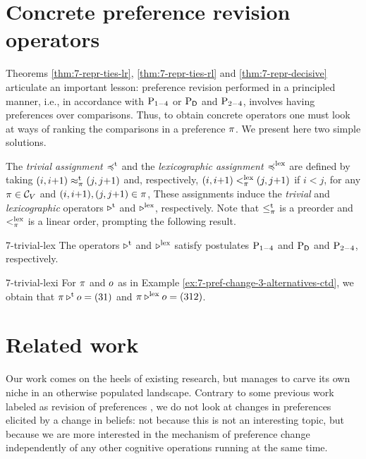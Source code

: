 \section{Concrete preference revision operators}\label{sec:7-concrete-operator}
Theorems \ref{thm:7-repr-ties-lr}, 
\ref{thm:7-repr-ties-rl} and \ref{thm:7-repr-decisive} articulate an important lesson:
preference revision performed in a principled manner, 
i.e., in accordance with $\mathrm{P}_{1-4}$ or $\mathrm{P}_{\mathsf{D}}$ and $\mathrm{P}_{2-4}$,
involves having preferences over comparisons.
Thus, to obtain concrete operators one must look at ways of 
ranking the comparisons in a preference $\pi$.
We present here two simple solutions.

The \emph{trivial assignment $\preccurlyeq^\mathrm{t}$}
and the \emph{lexicographic assignment $\preccurlyeq^\mathrm{lex}$} 
are defined by taking $({i},{i}{+}{1})\approx^\mathrm{t}_\pi({j},{j}{+}{1})$
and, respectively,
$
({i},{i}{+}{1})<^\mathrm{lex}_\pi({j},{j}{+}{1})
$ if $i<j$,
for any $\pi\in\mathcal{C}_V$ and $({i},{i}{+}{1}),({j},{j}{+}{1})\in\pi$,
These assignments induce the \emph{trivial} and \emph{lexicographic} operators $\triangleright^\mathrm{t}$ and $\triangleright^\mathrm{lex}$, respectively.
Note that $\le_{\pi}^\mathrm{t}$ is a preorder and $<^\mathrm{lex}_\pi$ is a linear order, prompting the following result.

\begin{prp}{}{7-trivial-lex}
	The operators $\triangleright^\mathrm{t}$ and $\triangleright^\mathrm{lex}$ satisfy postulates $\mathrm{P}_{1-4}$
	and $\mathrm{P}_{\mathsf{D}}$ and $\mathrm{P}_{2-4}$, respectively.	
\end{prp}

\begin{xmpl}{}{7-trivial-lexi}
	For $\pi$ and $o$ as in Example \ref{ex:7-pref-change-3-alternatives-ctd}, 
	we obtain that
	$\pi\triangleright^\mathrm{t}o=(31)$ and $\pi\triangleright^\mathrm{lex}o=(312)$.
\end{xmpl}













\section{Related work}\label{sec:7-rw}
Our work comes on the heels of existing research, 
but manages to carve its own niche in an otherwise 
populated landscape.
Contrary to some previous work labeled as revision of preferences \cite{Bradley07,LangT08,Liu11}, 
we do not look at changes in preferences elicited by a change in beliefs: 
not because this is not an interesting topic, but because we are more interested 
in the mechanism of preference change independently of any other cognitive operations 
running at the same time.


